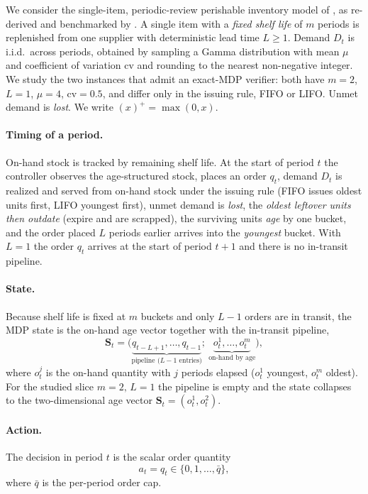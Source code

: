 \documentclass[11pt]{article}
\begin{document}
We consider the single-item, periodic-review perishable inventory model of
\citet{deMoor2022perishable}, as re-derived and benchmarked by \citet{farrington2025perishable}.
A single item with a \emph{fixed shelf life} of $m$ periods is replenished from one supplier with
deterministic lead time $L\ge 1$. Demand $D_t$ is i.i.d.\ across periods, obtained by sampling a
Gamma distribution with mean $\mu$ and coefficient of variation $\mathrm{cv}$ and rounding to the
nearest non-negative integer. We study the two instances that admit an exact-MDP verifier:
both have $m=2$, $L=1$, $\mu=4$, $\mathrm{cv}=0.5$, and differ only in the issuing rule, FIFO or LIFO.
Unmet demand is \emph{lost}. We write $(x)^+=\max(0,x)$.

\paragraph{Timing of a period.}
On-hand stock is tracked by remaining shelf life. At the start of period $t$ the controller observes
the age-structured stock, places an order $q_t$, demand $D_t$ is realized and served from on-hand
stock under the issuing rule (FIFO issues oldest units first, LIFO youngest first), unmet demand is
\emph{lost}, the \emph{oldest leftover units then outdate} (expire and are scrapped), the surviving
units \emph{age} by one bucket, and the order placed $L$ periods earlier arrives into the
\emph{youngest} bucket. With $L=1$ the order $q_t$ arrives at the start of period $t+1$ and there is
no in-transit pipeline.

\paragraph{State.}
Because shelf life is fixed at $m$ buckets and only $L-1$ orders are in transit, the MDP state is the
on-hand age vector together with the in-transit pipeline,
\begin{equation*}
    \mathbf{S}_t=\bigl(\underbrace{q_{t-L+1},\dots,q_{t-1}}_{\text{pipeline (}L-1\text{ entries)}};\ \underbrace{o^{1}_t,\dots,o^{m}_t}_{\text{on-hand by age}}\bigr),
\end{equation*}
where $o^{j}_t$ is the on-hand quantity with $j$ periods elapsed ($o^{1}_t$ youngest, $o^{m}_t$
oldest). For the studied slice $m=2,\,L=1$ the pipeline is empty and the state collapses to the
two-dimensional age vector $\mathbf{S}_t=(o^{1}_t,o^{2}_t)$.

\paragraph{Action.}
The decision in period $t$ is the scalar order quantity
\begin{equation*}
    a_t=q_t\in\{0,1,\dots,\bar q\},
\end{equation*}
where $\bar q$ is the per-period order cap.
\end{document}
